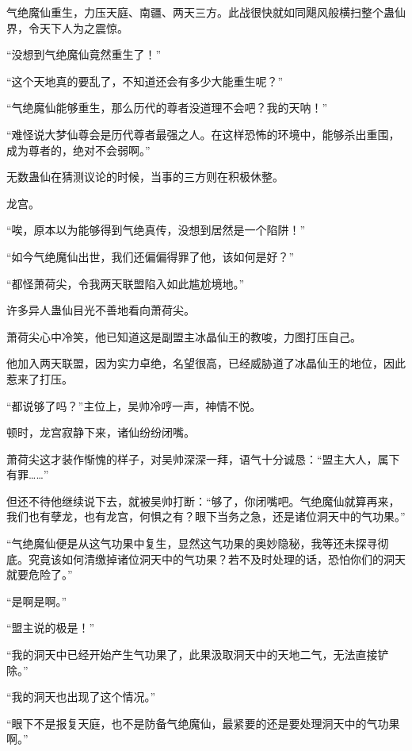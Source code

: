 
\begin{this_body}

气绝魔仙重生，力压天庭、南疆、两天三方。此战很快就如同飓风般横扫整个蛊仙界，令天下人为之震惊。

“没想到气绝魔仙竟然重生了！”

“这个天地真的要乱了，不知道还会有多少大能重生呢？”

“气绝魔仙能够重生，那么历代的尊者没道理不会吧？我的天呐！”

“难怪说大梦仙尊会是历代尊者最强之人。在这样恐怖的环境中，能够杀出重围，成为尊者的，绝对不会弱啊。”

无数蛊仙在猜测议论的时候，当事的三方则在积极休整。

龙宫。

“唉，原本以为能够得到气绝真传，没想到居然是一个陷阱！”

“如今气绝魔仙出世，我们还偏偏得罪了他，该如何是好？”

“都怪萧荷尖，令我两天联盟陷入如此尴尬境地。”

许多异人蛊仙目光不善地看向萧荷尖。

萧荷尖心中冷笑，他已知道这是副盟主冰晶仙王的教唆，力图打压自己。

他加入两天联盟，因为实力卓绝，名望很高，已经威胁道了冰晶仙王的地位，因此惹来了打压。

“都说够了吗？”主位上，吴帅冷哼一声，神情不悦。

顿时，龙宫寂静下来，诸仙纷纷闭嘴。

萧荷尖这才装作惭愧的样子，对吴帅深深一拜，语气十分诚恳：“盟主大人，属下有罪……”

但还不待他继续说下去，就被吴帅打断：“够了，你闭嘴吧。气绝魔仙就算再来，我们也有孽龙，也有龙宫，何惧之有？眼下当务之急，还是诸位洞天中的气功果。”

“气绝魔仙便是从这气功果中复生，显然这气功果的奥妙隐秘，我等还未探寻彻底。究竟该如何清缴掉诸位洞天中的气功果？若不及时处理的话，恐怕你们的洞天就要危险了。”

“是啊是啊。”

“盟主说的极是！”

“我的洞天中已经开始产生气功果了，此果汲取洞天中的天地二气，无法直接铲除。”

“我的洞天也出现了这个情况。”

“眼下不是报复天庭，也不是防备气绝魔仙，最紧要的还是要处理洞天中的气功果啊。”


\end{this_body}
